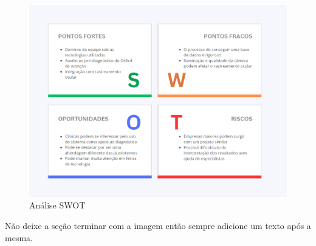 \documentclass[
  a4paper,%
  12pt,%
  english,%
  brazilian,%
]{article}
\begin{document}
\begin{figure}[H]
\centering
\caption{Análise SWOT}%
\label{fig:analise-swot}
\includegraphics[width=1.1\textwidth]{Logos/swot.png}
\end{figure}

    Não deixe a seção terminar com a imagem então sempre adicione um texto após a mesma.
\end{document}
